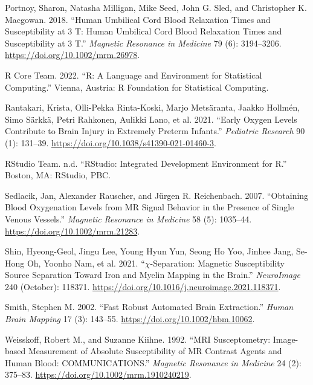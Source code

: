 \documentclass[
sn-nature
]{sn-jnl}
\newlength{\cslhangindent}
\newenvironment{CSLReferences}[2] %
 {\begin{list}{}{%
  \setlength{\itemindent}{0pt}
  \setlength{\leftmargin}{0pt}
  \setlength{\parsep}{0pt}
  \ifodd #1
   \setlength{\leftmargin}{\cslhangindent}
   \setlength{\itemindent}{-1\cslhangindent}
  \fi
  \setlength{\itemsep}{#2\baselineskip}}}
 {\end{list}}
\begin{document}
\begin{CSLReferences}{1}{0}
Portnoy, Sharon, Natasha Milligan, Mike Seed, John G. Sled, and
Christopher K. Macgowan. 2018. {``Human Umbilical Cord Blood Relaxation
Times and Susceptibility at 3 {T}: {Human Umbilical Cord Blood
Relaxation Times} and {Susceptibility} at 3 {T}.''} \emph{Magnetic
Resonance in Medicine} 79 (6): 3194--3206.
\url{https://doi.org/10.1002/mrm.26978}.

R Core Team. 2022. {``R: {A Language} and {Environment} for {Statistical
Computing}.''} Vienna, Austria: R Foundation for Statistical Computing.

Rantakari, Krista, Olli-Pekka Rinta-Koski, Marjo Metsäranta, Jaakko
Hollmén, Simo Särkkä, Petri Rahkonen, Aulikki Lano, et al. 2021.
{``Early Oxygen Levels Contribute to Brain Injury in Extremely Preterm
Infants.''} \emph{Pediatric Research} 90 (1): 131--39.
\url{https://doi.org/10.1038/s41390-021-01460-3}.

RStudio Team. n.d. {``{RStudio}: {Integrated Development Environment}
for {R}.''} Boston, MA: RStudio, PBC.

Sedlacik, Jan, Alexander Rauscher, and Jürgen R. Reichenbach. 2007.
{``Obtaining Blood Oxygenation Levels from {MR} Signal Behavior in the
Presence of Single Venous Vessels.''} \emph{Magnetic Resonance in
Medicine} 58 (5): 1035--44. \url{https://doi.org/10.1002/mrm.21283}.

Shin, Hyeong-Geol, Jingu Lee, Young Hyun Yun, Seong Ho Yoo, Jinhee Jang,
Se-Hong Oh, Yoonho Nam, et al. 2021. {``{\(\chi\)}-Separation:
{Magnetic} Susceptibility Source Separation Toward Iron and Myelin
Mapping in the Brain.''} \emph{NeuroImage} 240 (October): 118371.
\url{https://doi.org/10.1016/j.neuroimage.2021.118371}.

Smith, Stephen M. 2002. {``Fast Robust Automated Brain Extraction.''}
\emph{Human Brain Mapping} 17 (3): 143--55.
\url{https://doi.org/10.1002/hbm.10062}.

Weisskoff, Robert M., and Suzanne Kiihne. 1992. {``{MRI} Susceptometry:
{Image-based} Measurement of Absolute Susceptibility of {MR} Contrast
Agents and Human Blood: {COMMUNICATIONS}.''} \emph{Magnetic Resonance in
Medicine} 24 (2): 375--83. \url{https://doi.org/10.1002/mrm.1910240219}.


\end{CSLReferences}
\end{document}

